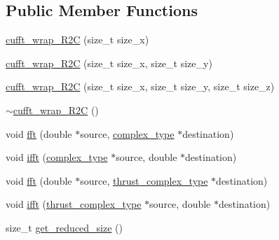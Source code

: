 \subsection*{Public Member Functions}
\begin{DoxyCompactItemize}
\item 
\hyperlink{classcufft__wrap__R2C_3_01double_01_4_ab2bbe7b38c73a83443c9c48ea5ad774a}{cufft\-\_\-wrap\-\_\-\-R2\-C} (size\-\_\-t size\-\_\-x)
\item 
\hyperlink{classcufft__wrap__R2C_3_01double_01_4_ad1fa9b4db529786784ceeb632520b3d9}{cufft\-\_\-wrap\-\_\-\-R2\-C} (size\-\_\-t size\-\_\-x, size\-\_\-t size\-\_\-y)
\item 
\hyperlink{classcufft__wrap__R2C_3_01double_01_4_a1d844d9be45a431fdfa77f4036531438}{cufft\-\_\-wrap\-\_\-\-R2\-C} (size\-\_\-t size\-\_\-x, size\-\_\-t size\-\_\-y, size\-\_\-t size\-\_\-z)
\item 
\hyperlink{classcufft__wrap__R2C_3_01double_01_4_a683ede86c1b81f99bc1d79de9786afaa}{$\sim$cufft\-\_\-wrap\-\_\-\-R2\-C} ()
\item 
void \hyperlink{classcufft__wrap__R2C_3_01double_01_4_a2a27ac78ac91a878cc72c8eab1488124}{fft} (double $\ast$source, \hyperlink{classcufft__wrap__R2C_3_01double_01_4_ac8d996c3659f68d38626422f74945e06}{complex\-\_\-type} $\ast$destination)
\item 
void \hyperlink{classcufft__wrap__R2C_3_01double_01_4_a072d8945cc6146113bad5d4381098286}{ifft} (\hyperlink{classcufft__wrap__R2C_3_01double_01_4_ac8d996c3659f68d38626422f74945e06}{complex\-\_\-type} $\ast$source, double $\ast$destination)
\item 
void \hyperlink{classcufft__wrap__R2C_3_01double_01_4_adf2c10bbe56151ded60369d5f43a4a71}{fft} (double $\ast$source, \hyperlink{classcufft__wrap__R2C_3_01double_01_4_abc41290148d975b62afbb5988527dc43}{thrust\-\_\-complex\-\_\-type} $\ast$destination)
\item 
void \hyperlink{classcufft__wrap__R2C_3_01double_01_4_a9f93fce49874cb5ca3977e3171b3d3e0}{ifft} (\hyperlink{classcufft__wrap__R2C_3_01double_01_4_abc41290148d975b62afbb5988527dc43}{thrust\-\_\-complex\-\_\-type} $\ast$source, double $\ast$destination)
\item 
size\-\_\-t \hyperlink{classcufft__wrap__R2C_3_01double_01_4_a3534a5c164792fbe66c59f443caffe61}{get\-\_\-reduced\-\_\-size} ()
\end{DoxyCompactItemize}


